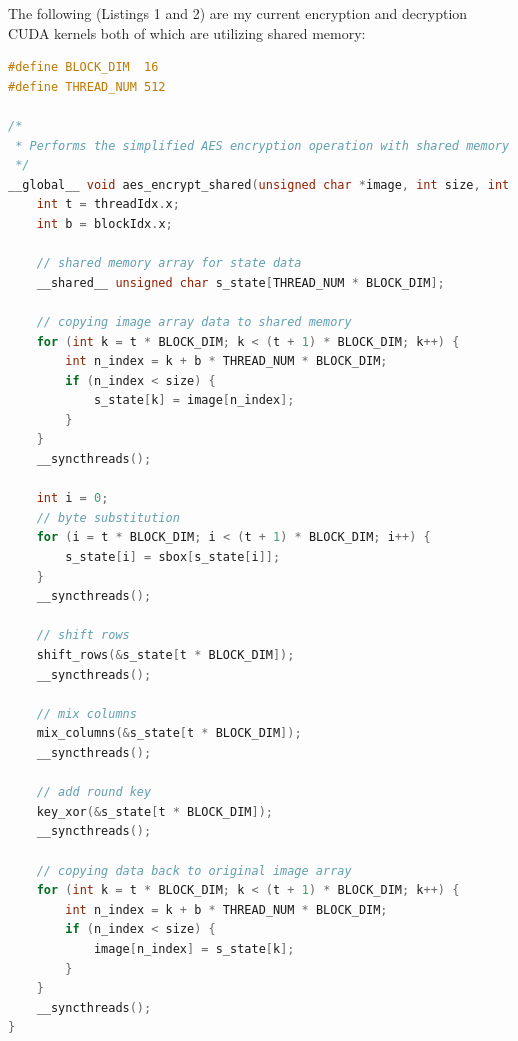 \noindent The following (Listings 1 and 2) are my current encryption and decryption CUDA kernels both of which are utilizing shared memory:
\newpage
\begin{shaded} 
\begin{lstlisting}[language=C, caption={AES Encryption Kernel}]
#define BLOCK_DIM  16
#define THREAD_NUM 512

/*
 * Performs the simplified AES encryption operation with shared memory
 */
__global__ void aes_encrypt_shared(unsigned char *image, int size, int key) {
    int t = threadIdx.x;
    int b = blockIdx.x;

    // shared memory array for state data
    __shared__ unsigned char s_state[THREAD_NUM * BLOCK_DIM];
    
    // copying image array data to shared memory
    for (int k = t * BLOCK_DIM; k < (t + 1) * BLOCK_DIM; k++) {
        int n_index = k + b * THREAD_NUM * BLOCK_DIM;
        if (n_index < size) {
            s_state[k] = image[n_index];
        }
    }
    __syncthreads();

    int i = 0;
    // byte substitution
    for (i = t * BLOCK_DIM; i < (t + 1) * BLOCK_DIM; i++) {
        s_state[i] = sbox[s_state[i]];
    }
    __syncthreads();

    // shift rows
    shift_rows(&s_state[t * BLOCK_DIM]);
    __syncthreads();

    // mix columns
    mix_columns(&s_state[t * BLOCK_DIM]);
    __syncthreads();

    // add round key
    key_xor(&s_state[t * BLOCK_DIM]);
    __syncthreads();

    // copying data back to original image array
    for (int k = t * BLOCK_DIM; k < (t + 1) * BLOCK_DIM; k++) {
        int n_index = k + b * THREAD_NUM * BLOCK_DIM;
        if (n_index < size) {
            image[n_index] = s_state[k];
        }
    }
    __syncthreads();
}
\end{lstlisting}
\end{shaded}

